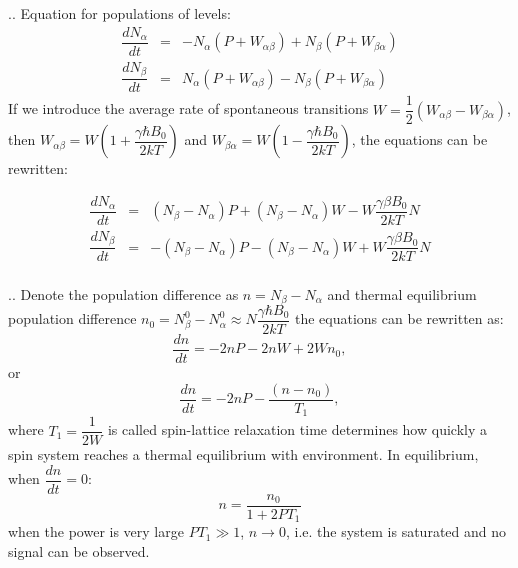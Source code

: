 \documentclass[handout]{beamer}
\begin{document}
\begin{frame}{\thesection.\thesubsection. \insertsubsection}
		Equation for populations of levels:
		\begin{equation}
		\begin{array}{lcl}
		\dfrac{dN_{\alpha}}{dt} &=& -N_{\alpha}(P + W_{\alpha \beta}) + N_{\beta}(P+W_{\beta \alpha})  \\
		\dfrac{dN_{\beta}}{dt} &=&  N_{\alpha}(P + W_{\alpha \beta}) - N_{\beta}(P+W_{\beta \alpha})  
		\end{array}
		\end{equation}
		\onslide<2->
		If we introduce the average rate of spontaneous transitions $W = \dfrac{1}{2}(W_{\alpha \beta} - W_{\beta \alpha})$, then $W_{\alpha \beta} = W(1 + \dfrac{\gamma \hbar B_0}{2kT})$ and $W_{ \beta \alpha} = W(1 - \dfrac{\gamma \hbar B_0}{2kT})$, the equations can be rewritten:
		
		\begin{equation}
		\begin{array}{lcl}
		\dfrac{dN_{\alpha}}{dt} &=& (N_{\beta} - N_{\alpha})P + (N_{\beta} - N_{\alpha})W - W\dfrac{\gamma \beta B_0}{2kT}N \\
		\dfrac{dN_{\beta}}{dt} &=& -(N_{\beta} - N_{\alpha})P - (N_{\beta} - N_{\alpha})W + W\dfrac{\gamma \beta B_0}{2kT}N \\
		\end{array}
		\end{equation}		
\end{frame}

\begin{frame}{\thesection.\thesubsection. \insertsubsection}
 Denote the population difference as $n = N_{\beta} - N_{\alpha}$ and thermal equilibrium population difference $n_0 = N_{\beta}^0 - N_{\alpha}^0 \approx N\dfrac{\gamma \hbar B_0}{2kT}$ the equations can be rewritten as:
		\begin{equation}
		   \dfrac{dn}{dt} = - 2 n P - 2 n W + 2W n_0,
		\end{equation}
		or
		\begin{equation}
		    \dfrac{dn}{dt} = - 2 n P -\dfrac{ (n - n_0)}{T_1},
		\end{equation}
		where $T_1 = \dfrac{1}{2W}$ is called \alert{spin-lattice relaxation time} determines how quickly a spin system reaches a thermal equilibrium with environment.
		\onslide<2-> In equilibrium, when $\dfrac{dn}{dt} = 0$:
		\begin{equation}
			n = \dfrac{n_0}{1 + 2 P T_1}
		\end{equation}
		when the power is very large $PT_1 \gg 1$, $n \rightarrow 0$, i.e. the system is \alert{saturated} and no signal can be observed.

\end{frame}
\end{document}
